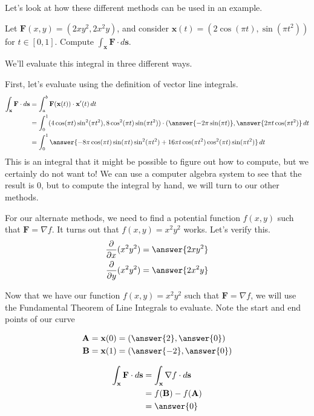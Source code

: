 \documentclass{ximera}
\begin{document}
Let's look at how these different methods can be used in an example.

\begin{example}
Let $\textbf{F}(x,y) = (2xy^2, 2x^2y)$, and consider $\textbf{x}(t)=(2\cos(\pi t),\sin(\pi t^2))$ for $t\in [0,1]$. Compute $\int_{\textbf{x}}\textbf{F}\cdot d\textbf{s}$.
\begin{explanation}
We'll evaluate this integral in three different ways.

First, let's evaluate using the definition of vector line integrals.
\begin{align*}
\int_{\textbf{x}}\textbf{F}\cdot d\textbf{s} &= \int_a^b\textbf{F}(\textbf{x}(t))\cdot \textbf{x}'(t)\,dt\\
&= \int_0^1(4\cos(\pi t)\sin^2(\pi t^2), 8\cos^2(\pi t)\sin(\pi t^2))\cdot (\answer{-2\pi\sin(\pi t)}, \answer{2\pi t\cos(\pi t^2)}\,dt\\
&= \int_0^1\answer{-8\pi\cos(\pi t)\sin(\pi t)\sin^2(\pi t^2) + 16\pi t\cos(\pi t^2)\cos^2(\pi t)\sin(\pi t^2)}\,dt
\end{align*}
This is an integral that it might be possible to figure out how to compute, but we certainly do not want to! We can use a computer algebra system to see that the result is $0$, but to compute the integral by hand, we will turn to our other methods.

For our alternate methods, we need to find a potential function $f(x,y)$ such that $\textbf{F}=\nabla f$. It turns out that $f(x,y)=x^2y^2$ works. Let's verify this.
\begin{align*}
\frac{\partial}{\partial x} (x^2y^2) &= \answer{2xy^2}\\
\frac{\partial}{\partial y} (x^2y^2) &= \answer{2x^2y}\\
\end{align*}

Now that we have our function $f(x,y)=x^2y^2$ such that $\textbf{F}=\nabla f$, we will use the Fundamental Theorem of Line Integrals to evaluate. Note the start and end points of our curve

\begin{align*}
\textbf{A} &= \textbf{x}(0) = (\answer{2}, \answer{0})\\
\textbf{B} &= \textbf{x}(1) = (\answer{-2}, \answer{0})\\
\end{align*}

\begin{align*}
\int_{\textbf{x}}\textbf{F}\cdot d\textbf{s} &= \int_{\textbf{x}}\nabla f\cdot d\textbf{s}\\
&= f(\textbf{B})-f(\textbf{A})\\
&= \answer{0}
\end{align*}


\end{explanation}
\end{example}
\end{document}
